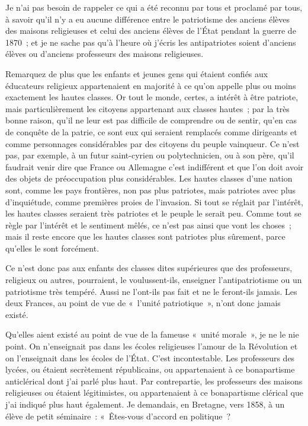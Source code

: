 \documentclass[french,twoside]{book} %
\begin{document}
Je n’ai pas besoin de rappeler ce qui a été reconnu par tous et proclamé par tous, à savoir qu’il n’y a eu aucune différence entre le patriotisme des anciens élèves des maisons religieuses et celui des anciens élèves de l’État pendant la guerre de 1870 ; et je ne sache pas qu’à l’heure où j’écris les antipatriotes soient d’anciens élèves ou d’anciens professeurs des maisons religieuses.\par
Remarquez de plus que les enfants et jeunes gens qui étaient confiés aux éducateurs religieux appartenaient en majorité à ce qu’on appelle plus ou moins exactement les hautes classes. Or tout le monde, certes, a intérêt à être patriote, mais particulièrement les citoyens appartenant aux classes  hautes ; par la très bonne raison, qu’il ne leur est pas difficile de comprendre ou de sentir, qu’en cas de conquête de la patrie, ce sont eux qui seraient remplacés comme dirigeants et comme personnages considérables par des citoyens du peuple vainqueur. Ce n’est pas, par exemple, à un futur saint-cyrien ou polytechnicien, ou à son père, qu’il faudrait venir dire que France ou Allemagne c’est indifférent et que l’on doit avoir des objets de préoccupation plus considérables. Les hautes classes d’une nation sont, comme les pays frontières, non pas plus patriotes, mais patriotes avec plus d’inquiétude, comme premières proies de l’invasion. Si tout se réglait par l’intérêt, les hautes classes seraient très patriotes et le peuple le serait peu. Comme tout se règle par l’intérêt et le sentiment mêlés, ce n’est pas ainsi que vont les choses ; mais il reste encore que les hautes classes sont patriotes plus sûrement, parce qu’elles le sont forcément.\par
Ce n’est donc pas aux enfants des classes dites supérieures que des professeurs, religieux ou autres, pourraient, le voulussent-ils, enseigner l’antipatriotisme ou un patriotisme très tempéré. Aussi ne l’ont-ils pas fait et ne le feront-ils jamais. Les deux Frances, au point de vue de « l’unité patriotique », n’ont donc jamais existé.\par
 Qu’elles aient existé au point de vue de la fameuse « unité morale », je ne le nie point. On n’enseignait pas dans les écoles religieuses l’amour de la Révolution et on l’enseignait dans les écoles de l’État. C’est incontestable. Les professeurs des lycées, ou étaient secrètement républicains, ou appartenaient à ce bonapartisme anticlérical dont j’ai parlé plus haut. Par contrepartie, les professeurs des maisons religieuses ou étaient légitimistes, ou appartenaient à ce bonapartisme clérical que j’ai indiqué plus haut également. Je demandais, en Bretagne, vers 1858, à un élève de petit séminaire : « Êtes-vous d’accord en politique ?\par
\end{document}
